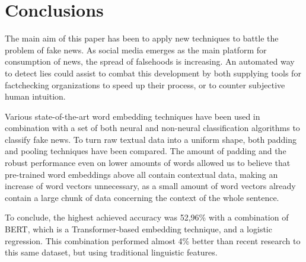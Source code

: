 \section{Conclusions}
The main aim of this paper has been to apply new techniques to battle the problem of fake news.
As social media emerges as the main platform for consumption of news, the spread of falsehoods is increasing. 
An automated way to detect lies could assist to combat this development by both supplying tools for factchecking organizations to speed up their process, or to counter subjective human intuition.

Various state-of-the-art word embedding techniques have been used in combination with a set of both neural and non-neural classification algorithms to classify fake news.
To turn raw textual data into a uniform shape, both padding and pooling techniques have been compared. 
The amount of padding and the robust performance even on lower amounts of words allowed us to believe that pre-trained word embeddings above all contain contextual data, making an increase of word vectors unnecessary, as a small amount of word vectors already contain a large chunk of data concerning the context of the whole sentence. 

To conclude, the highest achieved accuracy was 52,96\% with a combination of BERT, which is a Transformer-based embedding technique, and a logistic regression.
This combination performed almost 4\% better than recent research to this same dataset, but using traditional linguistic features. 

\pagebreak
